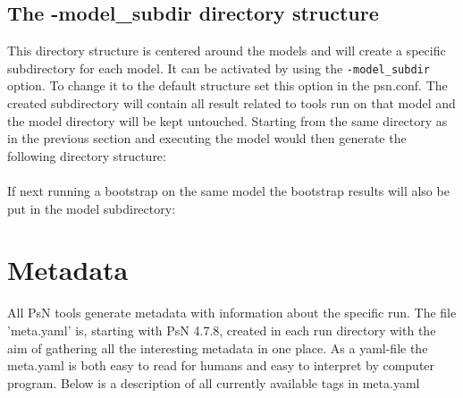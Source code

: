 \subsection{The -model\_subdir directory structure}
This directory structure is centered around the models and will create a specific subdirectory for each model. It can be activated by using the \verb|-model_subdir| option. To change it to the default structure set this option in the psn.conf. The created subdirectory will contain all result related to tools run on that model and the model directory will be kept untouched. Starting from the same directory as in the previous section and executing the model would then generate the following directory structure:
\\
~\\
If next running a bootstrap on the same model the bootstrap results will also be put in the model subdirectory:
\\

	\section{Metadata}
	All PsN tools generate metadata with information about the specific run. The file 'meta.yaml' is, starting with PsN 4.7.8, created in each run directory with the aim of gathering all the interesting metadata in one place. As a yaml-file the meta.yaml is both easy to read for humans and easy to interpret by computer program. Below is a description of all currently available tags in meta.yaml
	
